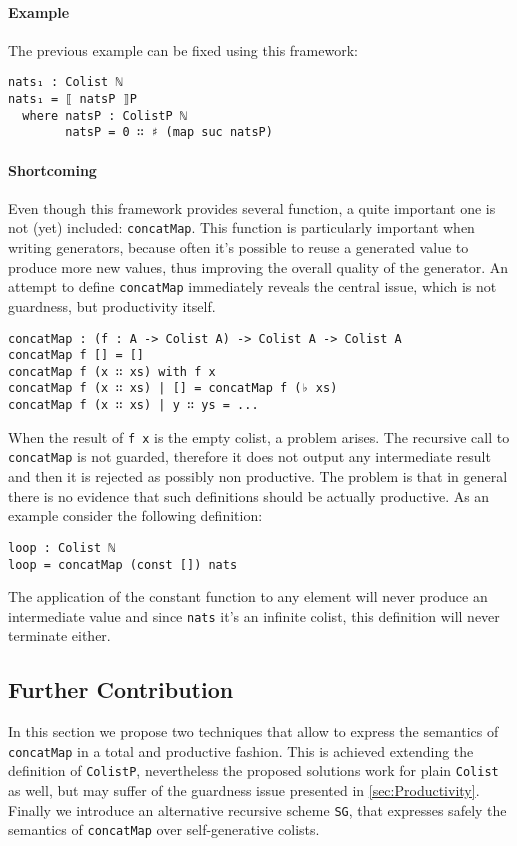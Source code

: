 \documentclass[10pt,a4paper]{article}
\begin{document}
\paragraph{Example}
The previous example can be fixed using this framework:
\begin{verbatim}
nats₁ : Colist ℕ
nats₁ = ⟦ natsP ⟧P
  where natsP : ColistP ℕ
        natsP = 0 ∷ ♯ (map suc natsP)
\end{verbatim}

\paragraph{Shortcoming}
Even though this framework provides several function, a quite important one is not (yet) included: \texttt{concatMap}.
This function is particularly important when writing generators, because often it's possible to reuse a generated value to produce more new values, thus improving the overall quality of the generator.
An attempt to define \texttt{concatMap} immediately reveals the central issue, which is not guardness, but productivity itself.
\begin{verbatim}
concatMap : (f : A -> Colist A) -> Colist A -> Colist A
concatMap f [] = []
concatMap f (x ∷ xs) with f x
concatMap f (x ∷ xs) | [] = concatMap f (♭ xs)
concatMap f (x ∷ xs) | y ∷ ys = ...
\end{verbatim}
When the result of \texttt{f x} is the empty colist, a problem arises.
The recursive call to \texttt{concatMap} is not guarded, therefore it does not output any intermediate result and then it is rejected as possibly non productive.
The problem is that in general there is no evidence that such definitions should be actually productive.
As an example consider the following definition:
\begin{verbatim}
loop : Colist ℕ
loop = concatMap (const []) nats
\end{verbatim}
The application of the constant function to any element will never produce an intermediate value and since \texttt{nats} it's an infinite colist, 
this definition will never terminate either.

\subsection{Further Contribution}
In this section we propose two techniques that allow to express the semantics of \texttt{concatMap} in a total and productive fashion.
This is achieved extending the definition of \texttt{ColistP}, nevertheless the proposed solutions work for plain \texttt{Colist} as well, but may suffer of the guardness issue presented in \ref{sec:Productivity}. Finally we introduce
an alternative recursive scheme \texttt{SG}, that expresses safely the semantics of \texttt{concatMap} over self-generative colists.
\end{document}
